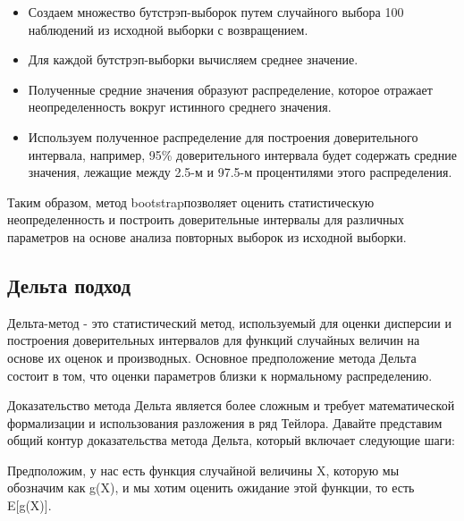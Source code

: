 \documentclass[specialist,
               substylefile = spbu_report.rtx,
               subf,href,colorlinks=true, 12pt]{disser}
\begin{document}
\begin{itemize}
    \item Создаем множество бутстрэп-выборок путем случайного выбора 100 наблюдений из исходной выборки с возвращением.
    \item Для каждой бутстрэп-выборки вычисляем среднее значение.
    \item Полученные средние значения образуют распределение, которое отражает неопределенность вокруг истинного среднего значения.
    \item Используем полученное распределение для построения доверительного интервала, например, 95\% доверительного интервала будет содержать средние значения, лежащие между 2.5-м и 97.5-м процентилями этого распределения.
\end{itemize}

Таким образом, метод bootstrapпозволяет оценить статистическую неопределенность и построить доверительные интервалы для различных параметров на основе анализа повторных выборок из исходной выборки.

\subsection{Дельта подход}

Дельта-метод - это статистический метод, используемый для оценки дисперсии и построения доверительных интервалов для функций случайных величин на основе их оценок и производных. Основное предположение метода Дельта состоит в том, что оценки параметров близки к нормальному распределению.


Доказательство метода Дельта является более сложным и требует математической формализации и использования разложения в ряд Тейлора. Давайте представим общий контур доказательства метода Дельта, который включает следующие шаги:

Предположим, у нас есть функция случайной величины X, которую мы обозначим как g(X), и мы хотим оценить ожидание этой функции, то есть E[g(X)].
\end{document}
